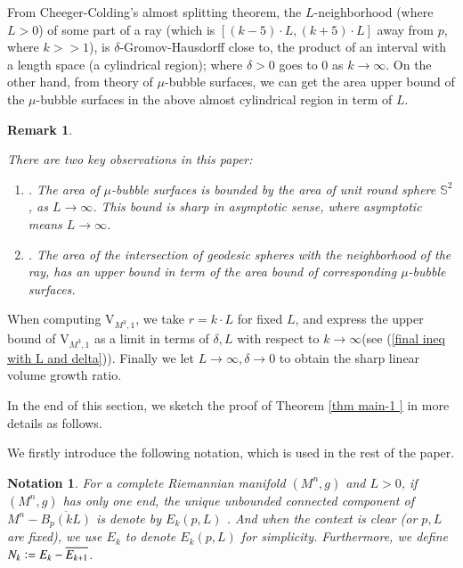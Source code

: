 \documentclass[11pt]{amsart}
\newtheorem{remark}[theorem]{Remark}
\newtheorem{notation}[theorem]{Notation}
\numberwithin{equation}{section}
\begin{document}
From Cheeger-Colding's almost splitting theorem,  the $L$-neighborhood (where $L> 0$)  of some part of a ray (which is $[(k- 5)\cdot L,  (k+ 5)\cdot L]$ away from $p$,  where $k>> 1$),  is $\delta$-Gromov-Hausdorff close to,  the product of an interval with a length space (a cylindrical region); where $\delta> 0$ goes to $0$ as $k\rightarrow \infty$.  On the other hand,  from theory of $\mu$-bubble surfaces,  we can get the area upper bound of the $\mu$-bubble surfaces in the above almost cylindrical region in term of $L$.  

\begin{remark}\label{rem key observations}
{There are two key observations in this paper: 
\begin{enumerate}
\item[(A)].  The area of $\mu$-bubble surfaces is bounded by the area of unit round sphere $\mathbb{S}^2$,  as $L\rightarrow \infty$.  This bound is sharp in asymptotic sense,  where asymptotic means $L\rightarrow \infty$.
\item[(B)].  The area of the intersection of geodesic spheres with the neighborhood of the ray,  has an upper bound in term of the area bound of corresponding $\mu$-bubble surfaces.
\end{enumerate}
}
\end{remark}

When computing $\mathrm{V}_{M^3, 1}$,  we take $r= k\cdot L$ for fixed $L$,  and express the upper bound of $\mathrm{V}_{M^3, 1}$ as a limit  in terms of $\delta,  L$ with respect to $k\rightarrow \infty$(see (\ref{final ineq with L and delta})).  Finally we let $L\rightarrow\infty,  \delta\rightarrow 0$ to obtain the sharp linear volume growth ratio.  
 
In the end of this section,  we sketch the proof of Theorem \ref{thm main-1 } in more details as follows.

We firstly introduce the following notation, which is used in the rest of the paper. 
\begin{notation}\label{notation Ek and Nk}
{For a complete Riemannian manifold $(M^n, g)$ and $L> 0$,  if $(M^n, g)$ has only one end,  the unique unbounded connected component of $M^n- \overline{B_p(kL)}$ is denote by $E_k(p, L)$ . And when the context is clear (or $p, L$ are fixed), we use $E_k$ to denote $E_k(p, L)$ for simplicity. Furthermore, we define $N_k\vcentcolon= E_k- \overline{E_{k+ 1}}$. 
}
\end{notation}
\end{document}
